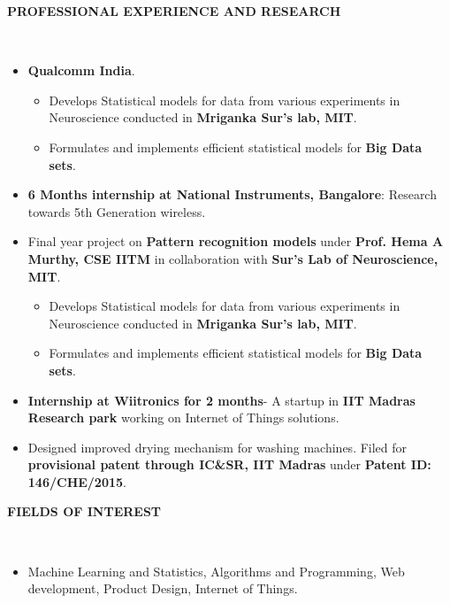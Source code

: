 \documentclass[a4paper,10pt]{article}
\newcommand{\lsep}{-0.5cm}
\newcommand{\resheading}[1]{{\small \colorbox{mygrey}{\begin{minipage}{0.975\textwidth}{\textbf{#1 \vphantom{p\^{E}}}}\end{minipage}}}}
\begin{document}
\resheading{\textbf{PROFESSIONAL EXPERIENCE AND RESEARCH} }\\[\lsep]
\begin{itemize}
    \vspace{3pt}
    \item \textbf{Qualcomm India}.
          \begin{itemize}
              \vspace{-5pt}
              \item Develops Statistical models for data from various experiments in Neuroscience conducted in \textbf{Mriganka Sur's lab, MIT}.
              \item Formulates and implements efficient statistical models for \textbf{Big Data sets}.
                    \vspace{-5pt}
          \end{itemize}
    \item \textbf{6 Months internship at National Instruments, Bangalore}: Research towards 5th Generation wireless.\vspace{-5pt}
    \item Final year project on \textbf{Pattern recognition models} under \textbf{Prof. Hema A Murthy, CSE IITM} in collaboration with \textbf{Sur's Lab of Neuroscience, MIT}.
          \begin{itemize}
              \vspace{-5pt}
              \item Develops Statistical models for data from various experiments in Neuroscience conducted in \textbf{Mriganka Sur's lab, MIT}.
              \item Formulates and implements efficient statistical models for \textbf{Big Data sets}.
                    \vspace{-5pt}
          \end{itemize}
    \item \textbf{Internship at Wiitronics for 2 months}- A startup in \textbf{IIT Madras Research park} working on Internet of Things solutions.\vspace{-5pt}
    \item Designed improved drying mechanism for washing machines. Filed for \textbf{provisional patent through IC\&SR, IIT Madras} under \textbf{Patent ID: 146/CHE/2015}.
\end{itemize}

\resheading{\textbf{FIELDS OF INTEREST} }\\[\lsep]
\begin{itemize}
    \vspace{3pt}
    \item \noindent Machine Learning and Statistics, Algorithms and Programming, Web development, Product Design, Internet of Things.
\end{itemize}
\end{document}
